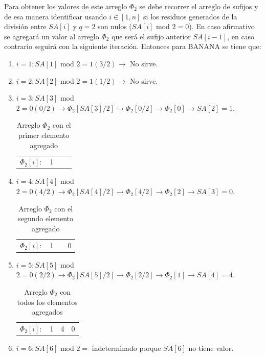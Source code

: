 Para obtener los valores de este arreglo $\Phi_{2}$ se debe recorrer el arreglo de sufijos y de esa manera identificar usando $i \in [1,n]$ si los residuos generados de la división entre $SA[i]$ y $q=2$ son nulos ($SA[i]$ mod $2 = 0$). En caso afirmativo se agregará un valor al arreglo $\Phi_{2}$ que será el sufijo anterior $SA[i-1]$, en caso contrario seguirá con la siguiente iteración. Entonces para BANANA se tiene que:

\begin{enumerate}

\item $i = 1: SA[1]$ mod $2 = 1 (3/2) \rightarrow$ No sirve.
\item $i = 2: SA[2]$ mod $2 = 1 (1/2) \rightarrow$ No sirve.
\item $i = 3: SA[3]$ mod $2 = 0 (0/2) \rightarrow \Phi_{2}[SA[3]/2] \rightarrow \Phi_{2}[0/2] \rightarrow \Phi_{2}[0]\rightarrow SA[2] = 1$.

\begin{table}[!htb]
\centering
\begin{tabular}{c|c|c|c|}
\cline{2-4}
$\Phi_{2}[i]:$ & 1 &  & \\ \cline{2-4}
\end{tabular}
\caption{Arreglo $\Phi_{2}$ con el primer elemento agregado}
\end{table}

\item $i = 4: SA[4]$ mod $2 = 0 (4/2) \rightarrow \Phi_{2}[SA[4]/2] \rightarrow \Phi_{2}[4/2] \rightarrow \Phi_{2}[2] \rightarrow SA[3] = 0$.

\begin{table}[!htb]
\centering
\begin{tabular}{c|c|c|c|}
\cline{2-4}
$\Phi_{2}[i]:$ & 1 &  & 0\\ \cline{2-4}
\end{tabular}
\caption{Arreglo $\Phi_{2}$ con el segundo elemento agregado}
\end{table}

\item $i = 5: SA[5]$ mod $2 = 0 (2/2) \rightarrow \Phi_{2}[SA[5]/2] \rightarrow \Phi_{2}[2/2] \rightarrow \Phi_{2}[1] \rightarrow SA[4] = 4$.

\begin{table}[!htb]
\centering
\begin{tabular}{c|c|c|c|}
\cline{2-4}
$\Phi_{2}[i]:$ & 1 & 4 & 0\\ \cline{2-4}
\end{tabular}
\caption{Arreglo $\Phi_{2}$ con todos los elementos agregados}
\end{table}

\item $i = 6: SA[6]$ mod $2 =$ indeterminado porque $SA[6]$ no tiene valor.

\end{enumerate}


